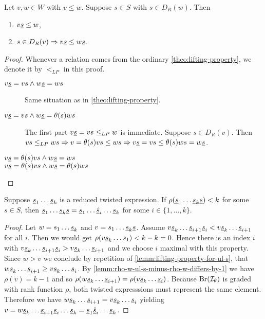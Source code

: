 \begin{lemm}
	Let $v,w \in W$ with $v \leq w$. Suppose $s \in S$ with $s \in D_R(w)$. Then
	\begin{enumerate}
		\item $v \underline{s} \leq w$,
		\item $s \in D_R(v) \Rightarrow v \underline{s} \leq w \underline{s}$.
	\end{enumerate}

	\begin{proof}
		Whenever a relation comes from the ordinary \ref{theo:lifting-property}, we denote it by $<_{LP}$ in this proof.
		\begin{description}
			\item[$v \underline{s} = vs \wedge w \underline{s} = ws$] Same situation as in \ref{theo:lifting-property}.
			\item[$v \underline{s} = vs \wedge w \underline{s} = \theta(s)ws$] The first part $v \underline{s} = vs \leq_{LP} w$ is immediate. Suppose $s \in D_R(v)$. Then $vs \leq_{LP} ws \Rightarrow v = \theta(s)vs \leq ws \Rightarrow v \underline{s} = vs \leq \theta(s)ws = w \underline{s}$. 
			\item[$v \underline{s} = \theta(s)vs \wedge w \underline{s} = ws$] \todo
			\item[$v \underline{s} = \theta(s)vs \wedge w \underline{s} = \theta(s)ws$] \todo \qedhere
		\end{description}
	\end{proof}
\end{lemm}

\begin{prop}
	Suppose $\underline{s}_1 \ldots \underline{s}_k$ is a reduced twisted expression. If $\rho(\underline{s}_1 \ldots \underline{s}_k \underline{s}) < k$ for some $s \in S$, then
	$\underline{s}_1 \ldots \underline{s}_k \underline{s} = \underline{s}_1 \ldots \underline{\hat s}_i \ldots \underline{s}_k$
	for some $i \in \{1,\ldots,k\}$.
	
	\begin{proof}
		Let $w = s_1 \ldots \underline{s}_k$ and $v = s_1 \ldots \underline{s}_k \underline{s}$. Assume $v \underline{s}_k \ldots \underline{s}_{i+1} \underline{s}_i < v \underline{s}_k \ldots \underline{s}_{i+1}$ for all $i$. Then we would get $\rho(v \underline{s}_k \ldots s_1) < k - k = 0$. Hence there is an index $i$ with $v \underline{s}_k \ldots \underline{s}_{i+1} \underline{s}_i > v \underline{s}_k \ldots \underline{s}_{i+1}$ and we choose $i$ maximal with this property. Since $w > v$ we conclude by repetition of \ref{lemm:lifting-property-for-ul-s}, that $w \underline{s}_k \ldots \underline{s}_{i+1} \geq v \underline{s}_k \ldots \underline{s}_i$. By \ref{lemm:rho-w-ul-s-minus-rho-w-differs-by-1} we have $\rho(v) = k - 1$ and so $\rho(w \underline{s}_k \ldots \underline{s}_{i+1}) = \rho(v \underline{s}_k \ldots \underline{s}_i)$. Because $\operatorname{Br}(\mathcal{I}_{\theta})$ is graded with rank function $\rho$, both twisted expresssions must represent the same element. Therefore we have $w \underline{s}_k \ldots \underline{s}_{i+1} = v \underline{s}_k \ldots \underline{s}_i$ yielding $v = w \underline{s}_k \ldots \underline{s}_{i+1} \underline{s}_i \ldots \underline{s}_k = \underline{s}_1 \underline{\hat s}_i \ldots \underline{s}_k$.
	\end{proof}
\end{prop}


